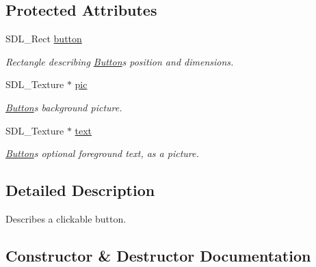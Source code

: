 \subsection*{Protected Attributes}
\begin{DoxyCompactItemize}
\item 
S\+D\+L\+\_\+\+Rect \hyperlink{class_button_aa552275b84734a66578ab684e51ab64a}{button}\hypertarget{class_button_aa552275b84734a66578ab684e51ab64a}{}\label{class_button_aa552275b84734a66578ab684e51ab64a}

\begin{DoxyCompactList}\small\item\em Rectangle describing \hyperlink{class_button}{Button}\textquotesingle{}s position and dimensions. \end{DoxyCompactList}\item 
S\+D\+L\+\_\+\+Texture $\ast$ \hyperlink{class_button_adf19f779ff118533b103aedcf743b8bf}{pic}\hypertarget{class_button_adf19f779ff118533b103aedcf743b8bf}{}\label{class_button_adf19f779ff118533b103aedcf743b8bf}

\begin{DoxyCompactList}\small\item\em \hyperlink{class_button}{Button}\textquotesingle{}s background picture. \end{DoxyCompactList}\item 
S\+D\+L\+\_\+\+Texture $\ast$ \hyperlink{class_button_a08d8969454e7a566717d2488a788bd78}{text}\hypertarget{class_button_a08d8969454e7a566717d2488a788bd78}{}\label{class_button_a08d8969454e7a566717d2488a788bd78}

\begin{DoxyCompactList}\small\item\em \hyperlink{class_button}{Button}\textquotesingle{}s optional foreground text, as a picture. \end{DoxyCompactList}\end{DoxyCompactItemize}


\subsection{Detailed Description}
Describes a clickable button. 

\subsection{Constructor \& Destructor Documentation}
